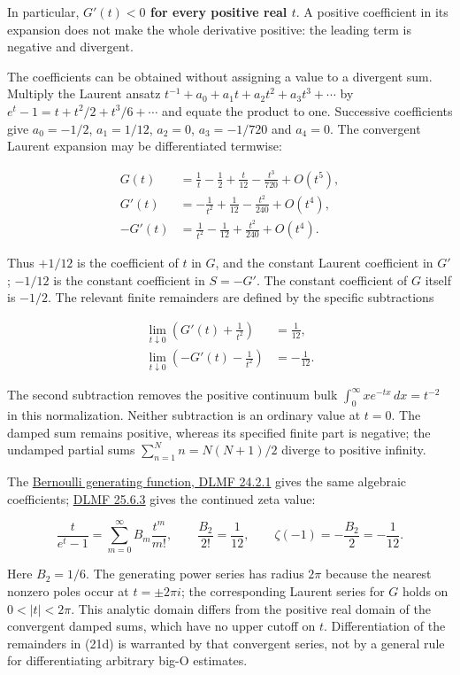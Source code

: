 \documentclass[11pt,a4paper]{article}
\begin{document}
In particular, \textbf{$G'(t)<0$ for every positive real $t$}. A positive coefficient in its expansion does not make the whole derivative positive: the leading term is negative and divergent.

The coefficients can be obtained without assigning a value to a divergent sum. Multiply the Laurent ansatz $t^{-1}+a_0+a_1t+a_2t^2+a_3t^3+\cdots$ by $e^t-1=t+t^2/2+t^3/6+\cdots$ and equate the product to one. Successive coefficients give $a_0=-1/2$, $a_1=1/12$, $a_2=0$, $a_3=-1/720$ and $a_4=0$. The convergent Laurent expansion may be differentiated termwise:

\[
\begin{aligned}
G(t)&=\frac1t-\frac12+\frac{t}{12}-\frac{t^3}{720}+O(t^5),\\
G'(t)&=-\frac1{t^2}+\frac1{12}-\frac{t^2}{240}+O(t^4),\\
-G'(t)&=\frac1{t^2}-\frac1{12}+\frac{t^2}{240}+O(t^4).
\end{aligned} \tag{21d}
\]

Thus $+1/12$ is the coefficient of $t$ in $G$, and the constant Laurent coefficient in $G'$; $-1/12$ is the constant coefficient in $S=-G'$. The constant coefficient of $G$ itself is $-1/2$. The relevant finite remainders are defined by the specific subtractions

\[
\begin{aligned}
\lim_{t\downarrow0}\left(G'(t)+\frac1{t^2}\right)&=\frac1{12},\\
\lim_{t\downarrow0}\left(-G'(t)-\frac1{t^2}\right)&=-\frac1{12}.
\end{aligned} \tag{21e}
\]

The second subtraction removes the positive continuum bulk $\int_0^\infty x e^{-tx}\,dx=t^{-2}$ in this normalization. Neither subtraction is an ordinary value at $t=0$. The damped sum remains positive, whereas its specified finite part is negative; the undamped partial sums $\sum_{n=1}^N n=N(N+1)/2$ diverge to positive infinity.

The \href{https://dlmf.nist.gov/24.2.E1}{Bernoulli generating function, DLMF 24.2.1} gives the same algebraic coefficients; \href{https://dlmf.nist.gov/25.6.E3}{DLMF 25.6.3} gives the continued zeta value:

\[
\frac{t}{e^t-1}=\sum_{m=0}^\infty B_m\frac{t^m}{m!},\qquad
\frac{B_2}{2!}=\frac1{12},\qquad \zeta(-1)=-\frac{B_2}{2}=-\frac1{12}. \tag{21f}
\]

Here $B_2=1/6$. The generating power series has radius $2\pi$ because the nearest nonzero poles occur at $t=\pm2\pi i$; the corresponding Laurent series for $G$ holds on $0<|t|<2\pi$. This analytic domain differs from the positive real domain of the convergent damped sums, which have no upper cutoff on $t$. Differentiation of the remainders in (21d) is warranted by that convergent series, not by a general rule for differentiating arbitrary big-O estimates.
\end{document}
